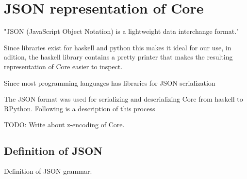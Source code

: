 \documentclass{article}
\begin{document}
\section{JSON representation of Core}

"JSON (JavaScript Object Notation) is a lightweight data interchange format."

Since libraries exist for haskell and python this makes it ideal for our use,
in adition, the haskell library contains a pretty printer that makes the resulting
representation of Core easier to inspect.

Since most programming languages has libraries for JSON serialization

The JSON format was used for serializing and deserializing Core from haskell to RPython.
Following is a description of this process


TODO: Write about z-encoding of Core.


\subsection{Definition of JSON}

Definition of JSON grammar:
\end{document}
